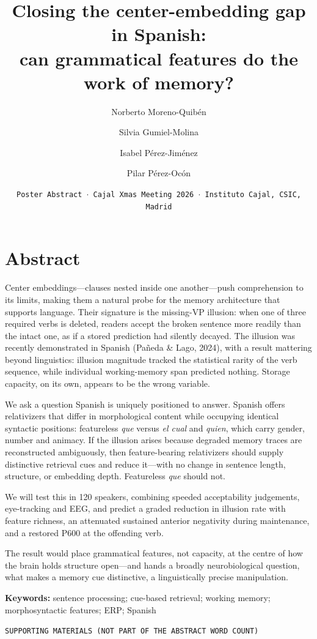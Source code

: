 \documentclass[12pt]{article}
\title{Closing the center-embedding gap in Spanish:\\can grammatical features do the work of memory?}
\author[1]{Norberto Moreno-Quibén}
\author[2]{Silvia Gumiel-Molina}
\author[3]{Isabel Pérez-Jiménez}
\author[4]{Pilar Pérez-Ocón}
\affil[1,2,3,4]{Departamento de Filología, Comunicación y Documentación, Universidad de Alcalá (UAH)}
\date{{\small {\tt Poster Abstract $\cdot$ Cajal Xmas Meeting 2026 $\cdot$ Instituto Cajal, CSIC, Madrid}}}
\newcommand{\es}[1]{\foreignlanguage{spanish}{\textit{#1}}}
\newcommand{\smallcapshead}[1]{{\color{accent}\small\texttt{\MakeUppercase{#1}}}\par\vspace{2pt}{\color{muted}\hrule}\vspace{8pt}}
\begin{document}
\maketitle

\section*{Abstract}

Center embeddings---clauses nested inside one another---push comprehension to its limits, making them a natural probe for the memory architecture that supports language. Their signature is the missing-VP illusion: when one of three required verbs is deleted, readers accept the broken sentence more readily than the intact one, as if a stored prediction had silently decayed. The illusion was recently demonstrated in Spanish (Pañeda \& Lago, 2024), with a result mattering beyond linguistics: illusion magnitude tracked the statistical rarity of the verb sequence, while individual working-memory span predicted nothing. Storage capacity, on its own, appears to be the wrong variable.

We ask a question Spanish is uniquely positioned to answer. Spanish offers relativizers that differ in morphological content while occupying identical syntactic positions: featureless \es{que} versus \es{el cual} and \es{quien}, which carry gender, number and animacy. If the illusion arises because degraded memory traces are reconstructed ambiguously, then feature-bearing relativizers should supply distinctive retrieval cues and reduce it---with no change in sentence length, structure, or embedding depth. Featureless \es{que} should not.

We will test this in 120 speakers, combining speeded acceptability judgements, eye-tracking and EEG, and predict a graded reduction in illusion rate with feature richness, an attenuated sustained anterior negativity during maintenance, and a restored P600 at the offending verb.

The result would place grammatical features, not capacity, at the centre of how the brain holds structure open---and hands a broadly neurobiological question, what makes a memory cue distinctive, a linguistically precise manipulation.

\vspace{6pt}
\textbf{Keywords:} sentence processing; cue-based retrieval; working memory; morphosyntactic features; ERP; Spanish

\vspace{14pt}
\smallcapshead{Supporting materials (not part of the abstract word count)}
\end{document}
